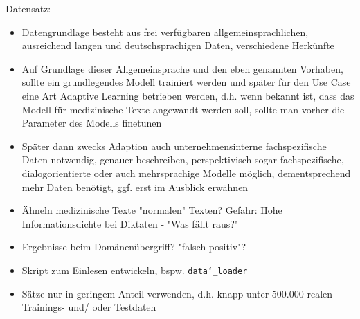 Datensatz:
\begin{itemize}
	\item Datengrundlage besteht aus frei verfügbaren allgemeinsprachlichen, ausreichend langen und deutschsprachigen Daten, verschiedene Herkünfte
	\item Auf Grundlage dieser Allgemeinsprache und den eben genannten Vorhaben, sollte ein grundlegendes Modell trainiert werden und später für den Use Case eine Art Adaptive Learning betrieben werden, d.h. wenn bekannt ist, dass das Modell für medizinische Texte angewandt werden soll, sollte man vorher die Parameter des Modells finetunen
	\item Später dann zwecks Adaption auch unternehmensinterne fachspezifische Daten notwendig, genauer beschreiben, perspektivisch sogar fachspezifische, dialogorientierte oder auch mehrsprachige Modelle möglich, dementsprechend mehr Daten benötigt, ggf. erst im Ausblick erwähnen
	\item Ähneln medizinische Texte "normalen" Texten? Gefahr: Hohe Informationsdichte bei Diktaten - "Was fällt raus?"
	\item Ergebnisse beim Domänenübergriff? "falsch-positiv"?
	\item Skript zum Einlesen entwickeln, bspw. \texttt{data\char`_loader}
	\item Sätze nur in geringem Anteil verwenden, d.h. knapp unter 500.000 realen Trainings- und/ oder Testdaten
\end{itemize}
